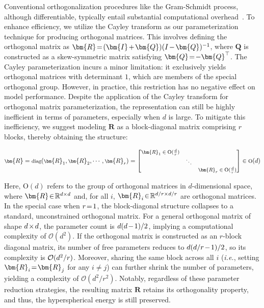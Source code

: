 Conventional orthogonalization procedures like the Gram-Schmidt process, although differentiable, typically entail substantial computational overhead~\cite{liu2021orthogonal}. To enhance efficiency, we utilize the Cayley transform as our parameterization technique for producing orthogonal matrices. This involves defining the orthogonal matrix as $\thickmuskip=2mu \medmuskip=2mu \bm{R} = (\bm{I} + \bm{Q})(I - \bm{Q})^{-1}$, where $\bm{Q}$ is constructed as a skew-symmetric matrix satisfying $\thickmuskip=2mu \medmuskip=2mu \bm{Q} = -\bm{Q}^\top$. The Cayley parameterization incurs a minor limitation: it exclusively yields orthogonal matrices with determinant $1$, which are members of the special orthogonal group. However, in practice, this restriction has no negative effect on model performance. Despite the application of the Cayley transform for orthogonal matrix parameterization, the representation can still be highly inefficient in terms of parameters, especially when $d$ is large. To mitigate this inefficiency, we suggest modeling $\bm{R}$ as a block-diagonal matrix comprising $r$ blocks, thereby obtaining the structure:

\begin{equation}
    \footnotesize
    \bm{R} = \text{diag}(\bm{R}_1, \bm{R}_2, \cdots, \bm{R}_r) = \begin{bmatrix}
    \bm{R}_1 \in \text{O}(\frac{d}{r}) &  & \\
    & \ddots & \\
    & & \bm{R}_r \in \text{O}(\frac{d}{r})
    \end{bmatrix} \in \text{O}(d)
\end{equation}

Here, $\text{O}(d)$ refers to the group of orthogonal matrices in $d$-dimensional space, where $\thickmuskip=2mu \medmuskip=2mu \bm{R} \in \mathbb{R}^{d \times d}$ and, for all $i$, $\thickmuskip=2mu \medmuskip=2mu \bm{R}_i \in \mathbb{R}^{d/r \times d/r}$ are orthogonal matrices. In the special case when $\thickmuskip=2mu \medmuskip=2mu r=1$, the block-diagonal structure collapses to a standard, unconstrained orthogonal matrix. For a general orthogonal matrix of shape $\thickmuskip=2mu \medmuskip=2mu d\times d$, the parameter count is $\thickmuskip=2mu \medmuskip=2mu d(d-1)/2$, implying a computational complexity of $\mathcal{O}(d^2)$. If the orthogonal matrix is constructed as an $r$-block diagonal matrix, its number of free parameters reduces to $\thickmuskip=2mu \medmuskip=2mu d(d/r-1)/2$, so its complexity is $\thickmuskip=2mu \medmuskip=2mu \mathcal{O}(d^2/r)$. Moreover, sharing the same block across all $i$ (\emph{i.e.}, setting $\thickmuskip=2mu \medmuskip=2mu \bm{R}_i = \bm{R}_j$ for any $i \neq j$) can further shrink the number of parameters, yielding a complexity of $\mathcal{O}(d^2/r^2)$. Notably, regardless of these parameter reduction strategies, the resulting matrix $\bm{R}$ retains its orthogonality property, and thus, the hyperspherical energy is still preserved.

